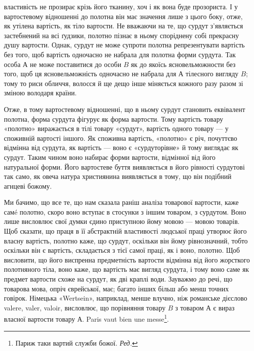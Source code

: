 \parcont{}  %
властивість не прозирає крізь його тканину, хоч і як вона буде
прозориста. І у вартостевому відношенні до полотна він має значення
лише з цього боку, отже, як утілена вартість, як тіло вартости.
Не вважаючи на те, що сурдут з’являється застебнений на
всі ґудзики, полотно пізнає в ньому споріднену собі прекрасну
душу вартости. Однак, сурдут не може супроти полотна репрезентувати
вартість без того, щоб вартість одночасно не набрала
для полотна форми сурдута. Так особа $А$ не може поставитися до
особи $B$ як до якоїсь ясновельможности без того, щоб ця ясновельможність
одночасно не набрала для $А$ тілесного вигляду $B$;
тому то риси обличчя, волосся й ще дещо інше міняється кожного
разу разом зі зміною володаря країни.

Отже, в тому вартостевому відношенні, що в ньому сурдут
становить еквівалент полотна, форма сурдута фігурує як форма
вартости. Тому вартість товару «полотно» виражається в тілі
товару «сурдут», вартість одного товару — у споживній вартості
іншого. Як споживна вартість, «полотно» є річ, почуттєво відмінна
від сурдута, як вартість — воно є «сурдуторівне» й тому
виглядає як сурдут. Таким чином воно набирає форми вартости,
відмінної від його натуральної форми. Його вартостеве буття
виявляється в його рівності сурдутові так само, як овеча натура
християнина виявляється в тому, що він подібний агнцеві божому.

Ми бачимо, що все те, що нам сказала раніш аналіза товарової
вартости, каже самé полотно, скоро воно вступає в стосунки з
іншим товаром, з сурдутом. Воно лише висловлює свої думки єдино
приступною йому мовою — мовою товарів. Щоб сказати, що
праця в її абстрактній властивості людської праці утворює його
власну вартість, полотно каже, що сурдут, оскільки він йому
рівнозначний, тобто оскільки він є вартість, складається з тієї
самої праці, як і воно, полотно. Щоб висловити, що його виспренна
предметність вартости відмінна від його жорсткого полотняного
тіла, воно каже, що вартість має вигляд сурдута, і тому
воно саме як предмет вартости схоже на сурдут, як дві краплі
води. Зауважмо до речі, що товарова мова, опріч єврейської, має;
багато інших більш або менш точних говірок. Німецька «Wertsein»,
наприклад, менше влучно, ніж романське дієслово valere,
valer, valoir, висловлює, що порівняння товару $B$ з товаром $А$ є
вираз власної вартости товару $А$. Paris vaut bien une messe\footnote*{
Париж таки вартий служби божої. \emph{Ред.}
}.

